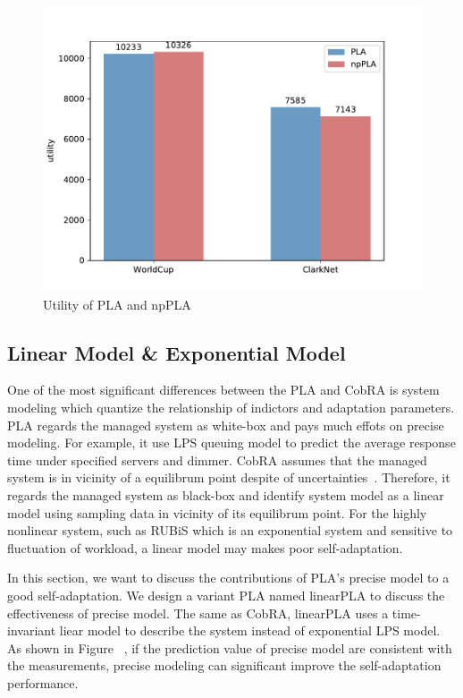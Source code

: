 \documentclass[sigconf]{acmart}
\begin{document}
\begin{figure}[!htp]
	\centering
	\includegraphics[width=\linewidth]{utility-np}
	\caption{Utility of PLA and npPLA}
	\label{fig:utility-np}
\end{figure}

\subsection{Linear Model \& Exponential Model}
One of the most significant differences between the PLA and CobRA is system modeling which quantize the relationship of indictors and adaptation parameters. PLA regards the managed system as white-box and pays much effots on precise modeling. For example, it use LPS queuing model to predict the average response time under specified servers and dimmer. CobRA assumes that the managed system is in vicinity of a equilibrum point despite of uncertainties~\cite{Sontag2013}. Therefore, it regards the managed system as black-box and identify system model as a linear model using sampling data in vicinity of its equilibrum point. For the highly nonlinear system, such as RUBiS which is an exponential system and sensitive to fluctuation of workload, a linear model may makes poor self-adaptation. 

In this section, we want to discuss the contributions of PLA's precise model to a good self-adaptation. We design a variant PLA named linearPLA to discuss the effectiveness of precise model. The same as CobRA, linearPLA uses a time-invariant liear model to describe the system instead of exponential LPS model. As shown in Figure ~\cite{prePLA}, if the prediction value of precise model are consistent with the measurements, precise modeling can significant improve the self-adaptation performance. 
\end{document}
